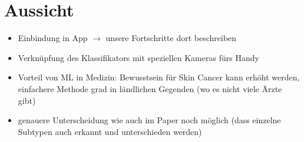 \section{Aussicht}

\begin{itemize}
	\item Einbindung in App $\rightarrow$ unsere Fortschritte dort beschreiben
	\item Verknüpfung des Klassifikators mit speziellen Kameras fürs Handy
	\item Vorteil von ML in Medizin: Bewusstsein für Skin Cancer kann erhöht werden, einfachere Methode grad in ländlichen Gegenden (wo es nicht viele Ärzte gibt)
	\item genauere Unterscheidung wie auch im Paper noch möglich (dass einzelne Subtypen auch erkannt und unterschieden werden)

\end{itemize}